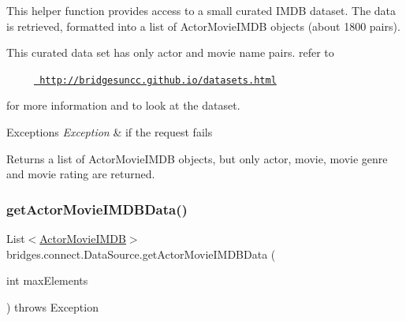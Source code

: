 This helper function provides access to a small curated I\+M\+DB dataset. The data is retrieved, formatted into a list of Actor\+Movie\+I\+M\+DB objects (about 1800 pairs).

This curated data set has only actor and movie name pairs. refer to 

~~~~~\href{http://bridgesuncc.github.io/datasets.html}{\texttt{ http\+://bridgesuncc.\+github.\+io/datasets.\+html}} 

for more information and to look at the dataset.


\begin{DoxyExceptions}{Exceptions}
{\em Exception} & if the request fails\\
\hline
\end{DoxyExceptions}
\begin{DoxyReturn}{Returns}
a list of Actor\+Movie\+I\+M\+DB objects, but only actor, movie, movie genre and movie rating are returned. 
\end{DoxyReturn}
\mbox{\label{classbridges_1_1connect_1_1_data_source_a3b3c231fee0ce328fb8f79807742aecd}} 
\subsubsection{\texorpdfstring{getActorMovieIMDBData()}{getActorMovieIMDBData()}\hspace{0.1cm}{\footnotesize\ttfamily [2/2]}}
{\footnotesize\ttfamily List$<$\mbox{\hyperlink{classbridges_1_1data__src__dependent_1_1_actor_movie_i_m_d_b}{Actor\+Movie\+I\+M\+DB}}$>$ bridges.\+connect.\+Data\+Source.\+get\+Actor\+Movie\+I\+M\+D\+B\+Data (\begin{DoxyParamCaption}\item[{int}]{max\+Elements }\end{DoxyParamCaption}) throws Exception}

\mbox{\label{classbridges_1_1connect_1_1_data_source_ae44e4ed7879e2755f8c66a335d8b6ad5}} 
